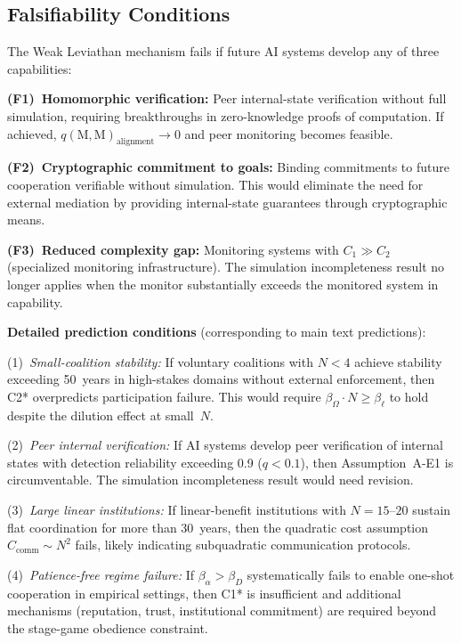 \documentclass[11pt]{article}
\begin{document}
\subsection{Falsifiability Conditions}
\label{sec:S6.5}

The Weak Leviathan mechanism fails if future AI systems develop any of three capabilities:

\textbf{(F1)~Homomorphic verification:} Peer internal-state verification without full simulation, requiring breakthroughs in zero-knowledge proofs of computation. If achieved, $q(\text{M},\text{M})_{\text{alignment}} \to 0$ and peer monitoring becomes feasible.

\textbf{(F2)~Cryptographic commitment to goals:} Binding commitments to future cooperation verifiable without simulation. This would eliminate the need for external mediation by providing internal-state guarantees through cryptographic means.

\textbf{(F3)~Reduced complexity gap:} Monitoring systems with $C_1 \gg C_2$ (specialized monitoring infrastructure). The simulation incompleteness result no longer applies when the monitor substantially exceeds the monitored system in capability.

\textbf{Detailed prediction conditions} (corresponding to main text predictions):

(1)~\emph{Small-coalition stability:} If voluntary coalitions with $N < 4$ achieve stability exceeding 50~years in high-stakes domains without external enforcement, then C2* overpredicts participation failure. This would require $\beta_\Omega \cdot N \geq \beta_\ell$ to hold despite the dilution effect at small~$N$.

(2)~\emph{Peer internal verification:} If AI systems develop peer verification of internal states with detection reliability exceeding 0.9 ($q < 0.1$), then Assumption~A-E1 is circumventable. The simulation incompleteness result would need revision.

(3)~\emph{Large linear institutions:} If linear-benefit institutions with $N = 15$--$20$ sustain flat coordination for more than 30~years, then the quadratic cost assumption $C_{\text{comm}} \sim N^2$ fails, likely indicating subquadratic communication protocols.

(4)~\emph{Patience-free regime failure:} If $\beta_\alpha > \beta_D$ systematically fails to enable one-shot cooperation in empirical settings, then C1* is insufficient and additional mechanisms (reputation, trust, institutional commitment) are required beyond the stage-game obedience constraint.
\end{document}
